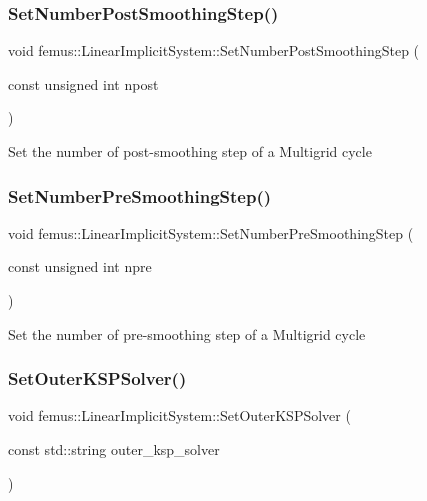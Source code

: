 \subsubsection{\texorpdfstring{Set\+Number\+Post\+Smoothing\+Step()}{SetNumberPostSmoothingStep()}}
{\footnotesize\ttfamily void femus\+::\+Linear\+Implicit\+System\+::\+Set\+Number\+Post\+Smoothing\+Step (\begin{DoxyParamCaption}\item[{const unsigned int}]{npost }\end{DoxyParamCaption})\hspace{0.3cm}{\ttfamily [inline]}}

Set the number of post-\/smoothing step of a Multigrid cycle \mbox{\label{classfemus_1_1_linear_implicit_system_a5b04e5c05fef4ec2909ab9a959e18bd4}} 
\subsubsection{\texorpdfstring{Set\+Number\+Pre\+Smoothing\+Step()}{SetNumberPreSmoothingStep()}}
{\footnotesize\ttfamily void femus\+::\+Linear\+Implicit\+System\+::\+Set\+Number\+Pre\+Smoothing\+Step (\begin{DoxyParamCaption}\item[{const unsigned int}]{npre }\end{DoxyParamCaption})\hspace{0.3cm}{\ttfamily [inline]}}

Set the number of pre-\/smoothing step of a Multigrid cycle \mbox{\label{classfemus_1_1_linear_implicit_system_a4777685603af1b46ca890fbe2e786f79}} 
\subsubsection{\texorpdfstring{Set\+Outer\+K\+S\+P\+Solver()}{SetOuterKSPSolver()}}
{\footnotesize\ttfamily void femus\+::\+Linear\+Implicit\+System\+::\+Set\+Outer\+K\+S\+P\+Solver (\begin{DoxyParamCaption}\item[{const std\+::string}]{outer\+\_\+ksp\+\_\+solver }\end{DoxyParamCaption})\hspace{0.3cm}{\ttfamily [inline]}}

